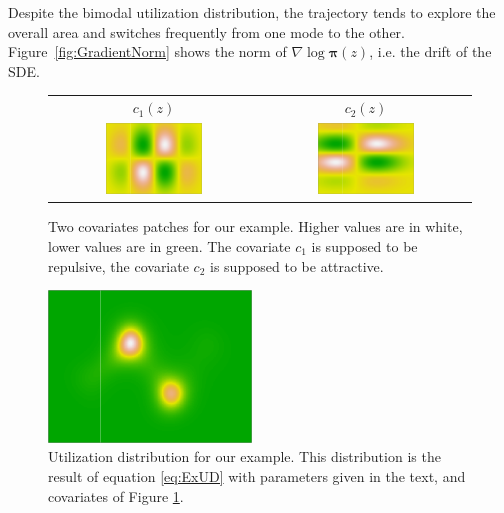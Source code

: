 \documentclass[10pt,a4paper]{article}
\newcommand{\ud}{\boldsymbol{\pi}}
\begin{document}
Despite the bimodal utilization distribution, the trajectory tends to explore the overall area and switches frequently from one mode to the other. Figure~\ref{fig:GradientNorm} shows the norm of $\nabla \log \ud(z)$, i.e. the drift of the SDE.
\begin{figure}
\centering
\begin{tabular}{cc}
$c_1(z)$ & $c_2(z)$\\
\includegraphics[width = 0.48\textwidth]{figures/Covariate1}&
\includegraphics[width = 0.48\textwidth]{figures/Covariate2}
\end{tabular}
\caption{\label{fig:Covariates} Two covariates patches for our example. Higher values are in white, lower values are in green. The covariate $c_1$ is supposed to be repulsive, the covariate $c_2$ is supposed to be attractive.}
\end{figure}
\begin{figure}
\centering
\includegraphics[width = 0.48\textwidth]{figures/ResultingUD}
\caption{\label{fig:ResultUD} Utilization distribution for our example. This distribution is the result of equation \eqref{eq:ExUD} with parameters given in the text, and covariates of Figure \ref{fig:Covariates}.}
\end{figure}
\end{document}
